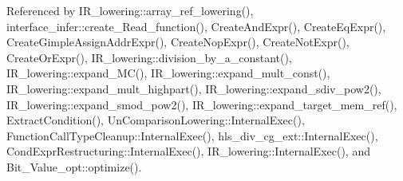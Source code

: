 Referenced by I\+R\+\_\+lowering\+::array\+\_\+ref\+\_\+lowering(), interface\+\_\+infer\+::create\+\_\+\+Read\+\_\+function(), Create\+And\+Expr(), Create\+Eq\+Expr(), Create\+Gimple\+Assign\+Addr\+Expr(), Create\+Nop\+Expr(), Create\+Not\+Expr(), Create\+Or\+Expr(), I\+R\+\_\+lowering\+::division\+\_\+by\+\_\+a\+\_\+constant(), I\+R\+\_\+lowering\+::expand\+\_\+\+M\+C(), I\+R\+\_\+lowering\+::expand\+\_\+mult\+\_\+const(), I\+R\+\_\+lowering\+::expand\+\_\+mult\+\_\+highpart(), I\+R\+\_\+lowering\+::expand\+\_\+sdiv\+\_\+pow2(), I\+R\+\_\+lowering\+::expand\+\_\+smod\+\_\+pow2(), I\+R\+\_\+lowering\+::expand\+\_\+target\+\_\+mem\+\_\+ref(), Extract\+Condition(), Un\+Comparison\+Lowering\+::\+Internal\+Exec(), Function\+Call\+Type\+Cleanup\+::\+Internal\+Exec(), hls\+\_\+div\+\_\+cg\+\_\+ext\+::\+Internal\+Exec(), Cond\+Expr\+Restructuring\+::\+Internal\+Exec(), I\+R\+\_\+lowering\+::\+Internal\+Exec(), and Bit\+\_\+\+Value\+\_\+opt\+::optimize().

